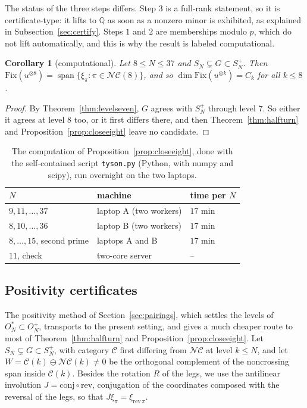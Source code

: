 \documentclass[11pt]{amsart}
\newtheorem{corollary}[theorem]{Corollary}
\theoremstyle{definition}
\theoremstyle{remark}
\theoremstyle{plain}
\numberwithin{equation}{section}
\numberwithin{table}{section}
\newcommand{\Q}{\mathbb Q}
\newcommand{\Fix}{\mathrm{Fix}}
\newcommand{\NC}{\mathcal{NC}}
\DeclareMathOperator{\spn}{span}
\begin{document}
The status of the three steps differs. Step $3$ is a full-rank statement, so it is certificate-type: it lifts to $\Q$ as soon as a nonzero minor is exhibited, as explained in Subsection~\ref{sec:certify}. Steps $1$ and $2$ are memberships modulo $p$, which do not lift automatically, and this is why the result is labeled computational.

\begin{corollary}[computational]\label{cor:closeeight}
Let $8\le N\le37$ and $S_N\subsetneq G\subset S_N^+$. Then $\Fix(u^{\otimes8})=\spn\{\xi_\pi:\pi\in\NC(8)\}$, and so $\dim\Fix(u^{\otimes k})=C_k$ for all $k\le8$.
\end{corollary}

\begin{proof}
By Theorem~\ref{thm:levelseven}, $G$ agrees with $S_N^+$ through level $7$. So either it agrees at level $8$ too, or it first differs there, and then Theorem~\ref{thm:halfturn} and Proposition~\ref{prop:closeeight} leave no candidate.
\end{proof}

\begin{table}[ht]
\centering
\begin{tabular}{@{}lll@{}}
\toprule
$N$ & machine & time per $N$\\
\midrule
$9,11,\dots,37$ & laptop A (two workers) & $17$ min\\
$8,10,\dots,36$ & laptop B (two workers) & $17$ min\\
$8,\dots,15$, second prime & laptops A and B & $17$ min\\
$11$, check & two-core server & --\\
\bottomrule
\end{tabular}
\caption{The computation of Proposition~\ref{prop:closeeight}, done with the self-contained script \texttt{tyson.py} (Python, with numpy and scipy), run overnight on the two laptops.}
\end{table}

\subsection{Positivity certificates}\label{sec:positivity}

The positivity method of Section~\ref{sec:pairings}, which settles the levels of $O_N^*\subset O_N^+$, transports to the present setting, and gives a much cheaper route to most of Theorem~\ref{thm:halfturn} and Proposition~\ref{prop:closeeight}. Let $S_N\subsetneq G\subset S_N^+$, with category $\mathcal C$ first differing from $\NC$ at level $k\le N$, and let $W=\mathcal C(k)\ominus\NC(k)\ne0$ be the orthogonal complement of the noncrossing span inside $\mathcal C(k)$. Besides the rotation $R$ of the legs, we use the antilinear involution $J=\mathrm{conj}\circ\mathrm{rev}$, conjugation of the coordinates composed with the reversal of the legs, so that $J\xi_\pi=\xi_{\mathrm{rev}\,\pi}$.
\end{document}
